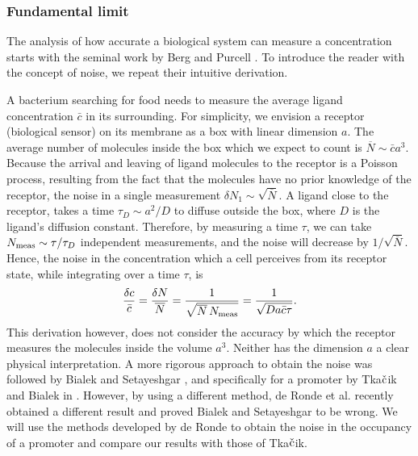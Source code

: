 \subsubsection{Fundamental limit}
The analysis of how accurate a biological system can measure a concentration starts with the seminal work by Berg and Purcell \cite{Berg1977}. To introduce the reader with the concept of noise, we repeat their intuitive derivation. 

A bacterium searching for food needs to measure the average ligand concentration $\bar{c}$ in its surrounding. For simplicity, we envision a receptor (biological sensor) on its membrane as a box with linear dimension $a$. The average number of molecules inside the box which we expect to count is $\overline{N} \sim \bar{c} a^3$. Because the arrival and leaving of ligand molecules to the receptor is a Poisson process, resulting from the fact that the molecules have no prior knowledge of the receptor, the noise in a single measurement $\delta N_1 \sim \sqrt{\overline{N}}$. A ligand close to the receptor, takes a time $\tau_D \sim a^2/D$ to diffuse outside the box, where $D$ is the ligand's diffusion constant. Therefore, by measuring a time $\tau$, we can take $N_{\rm meas} \sim \tau/\tau_D$ independent measurements, and the noise will decrease by $1/\sqrt{\overline{N}}$. Hence, the noise in the concentration which a cell perceives from its receptor state, while integrating over a time $\tau$, is
\begin{equation}
 \frac{\delta c}{\bar{c}} = \frac{\delta N}{\overline{N}} = \frac{1}{\sqrt{\overline{N}\,N_{\rm meas}}} = \frac{1}{\sqrt{D a \bar{c} \tau}}.
\end{equation}
This derivation however, does not consider the accuracy by which the receptor measures the molecules inside the volume $a^3$. Neither has the dimension $a$ a clear physical interpretation. A more rigorous approach to obtain the noise was followed by Bialek and Setayeshgar \cite{Bialek2005}, and specifically for a promoter by Tka$\check{\rm c}$ik and Bialek in \cite{Tkacik2009}. However, by using a different method, de Ronde et al. recently obtained a different result \cite{DeRonde2012} and proved Bialek and Setayeshgar to be wrong. We will use the methods developed by de Ronde to obtain the noise in the occupancy of a promoter and compare our results with those of Tka$\check{\rm c}$ik.

